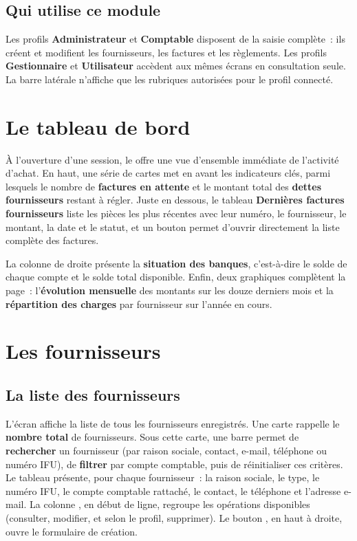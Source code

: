 \section{Qui utilise ce module}
Les profils \textbf{Administrateur} et \textbf{Comptable} disposent de la saisie complète~: ils créent et modifient les fournisseurs, les factures et les règlements. Les profils \textbf{Gestionnaire} et \textbf{Utilisateur} accèdent aux mêmes écrans en consultation seule. La barre latérale n'affiche que les rubriques autorisées pour le profil connecté.

\chapter{Le tableau de bord}

À l'ouverture d'une session, le  offre une vue d'ensemble immédiate de l'activité d'achat. En haut, une série de cartes met en avant les indicateurs clés, parmi lesquels le nombre de \textbf{factures en attente} et le montant total des \textbf{dettes fournisseurs} restant à régler. Juste en dessous, le tableau \textbf{Dernières factures fournisseurs} liste les pièces les plus récentes avec leur numéro, le fournisseur, le montant, la date et le statut, et un bouton permet d'ouvrir directement la liste complète des factures.

La colonne de droite présente la \textbf{situation des banques}, c'est-à-dire le solde de chaque compte et le solde total disponible. Enfin, deux graphiques complètent la page~: l'\textbf{évolution mensuelle} des montants sur les douze derniers mois et la \textbf{répartition des charges} par fournisseur sur l'année en cours.


\chapter{Les fournisseurs}

\section{La liste des fournisseurs}
L'écran  affiche la liste de tous les fournisseurs enregistrés. Une carte rappelle le \textbf{nombre total} de fournisseurs. Sous cette carte, une barre permet de \textbf{rechercher} un fournisseur (par raison sociale, contact, e-mail, téléphone ou numéro IFU), de \textbf{filtrer} par compte comptable, puis de réinitialiser ces critères. Le tableau présente, pour chaque fournisseur~: la raison sociale, le type, le numéro IFU, le compte comptable rattaché, le contact, le téléphone et l'adresse e-mail. La colonne , en début de ligne, regroupe les opérations disponibles (consulter, modifier, et selon le profil, supprimer). Le bouton , en haut à droite, ouvre le formulaire de création.

